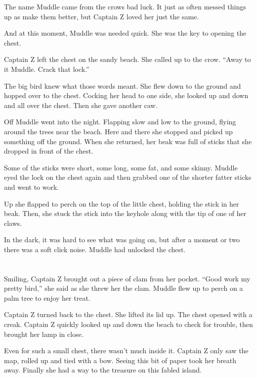 \documentclass[12pt]{extbook}
\begin{document}
  The name Muddle came from the crows bad luck. It just as often messed
  things up as make them better, but Captain Z loved her just the same.
  
  And at this moment, Muddle was needed quick. She was the key to opening
  the chest.
  
  Captain Z left the chest on the sandy beach. She called up to the crow.
  \enquote{Away to it Muddle. Crack that lock.}
  
  The big bird knew what those words meant. She flew down to the ground
  and hopped over to the chest. Cocking her head to one side, she looked
  up and down and all over the chest. Then she gave another caw.
  
  Off Muddle went into the night. Flapping slow and low to the ground,
  flying around the trees near the beach. Here and there she stopped and
  picked up something off the ground. When she returned, her beak was full
  of sticks that she dropped in front of the chest.
  
  Some of the sticks were short, some long, some fat, and some skinny.
  Muddle eyed the lock on the chest again and then grabbed one of the
  shorter fatter sticks and went to work.
  
  Up she flapped to perch on the top of the little chest, holding the
  stick in her beak. Then, she stuck the stick into the keyhole along with
  the tip of one of her claws.
  
  In the dark, it was hard to see what was going on, but after a moment or
  two there was a soft click noise. Muddle had unlocked the chest.
  
  \section{}\label{section-11}
  
  Smiling, Captain Z brought out a piece of clam from her pocket.
  \enquote{Good work my pretty bird,} she said as she threw her the clam.
  Muddle flew up to perch on a palm tree to enjoy her treat.
  
  Captain Z turned back to the chest. She lifted its lid up. The chest
  opened with a creak. Captain Z quickly looked up and down the beach to
  check for trouble, then brought her lamp in close.
  
  Even for such a small chest, there wasn't much inside it. Captain Z only
  saw the map, rolled up and tied with a bow. Seeing this bit of paper
  took her breath away. Finally she had a way to the treasure on this
  fabled island.
  
\end{document}
